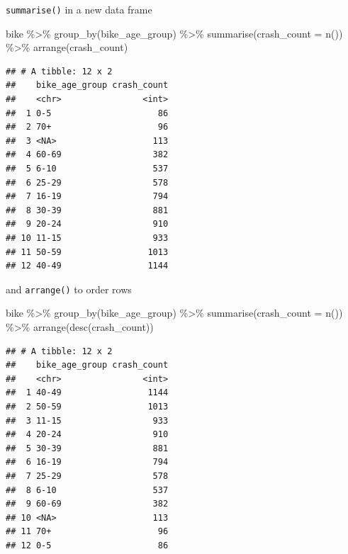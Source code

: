\documentclass[
  ignorenonframetext,
]{beamer}
\newenvironment{Shaded}{\begin{snugshade}}{\end{snugshade}}
\newcommand{\AttributeTok}[1]{\textcolor[rgb]{0.77,0.63,0.00}{#1}}
\newcommand{\FunctionTok}[1]{\textcolor[rgb]{0.00,0.00,0.00}{#1}}
\newcommand{\NormalTok}[1]{#1}
\newcommand{\SpecialCharTok}[1]{\textcolor[rgb]{0.00,0.00,0.00}{#1}}
\begin{document}
\begin{frame}[fragile]{\texttt{summarise()} in a new data frame}
\protect\hypertarget{summarise-in-a-new-data-frame}{}
\begin{Shaded}
\begin{Highlighting}[]
\NormalTok{bike }\SpecialCharTok{\%\textgreater{}\%}
  \FunctionTok{group\_by}\NormalTok{(bike\_age\_group) }\SpecialCharTok{\%\textgreater{}\%}
  \FunctionTok{summarise}\NormalTok{(}\AttributeTok{crash\_count =} \FunctionTok{n}\NormalTok{()) }\SpecialCharTok{\%\textgreater{}\%}
  \FunctionTok{arrange}\NormalTok{(crash\_count)}
\end{Highlighting}
\end{Shaded}

\begin{verbatim}
## # A tibble: 12 x 2
##    bike_age_group crash_count
##    <chr>                <int>
##  1 0-5                     86
##  2 70+                     96
##  3 <NA>                   113
##  4 60-69                  382
##  5 6-10                   537
##  6 25-29                  578
##  7 16-19                  794
##  8 30-39                  881
##  9 20-24                  910
## 10 11-15                  933
## 11 50-59                 1013
## 12 40-49                 1144
\end{verbatim}
\end{frame}

\begin{frame}[fragile]{and \texttt{arrange()} to order rows}
\protect\hypertarget{and-arrange-to-order-rows}{}
\begin{Shaded}
\begin{Highlighting}[]
\NormalTok{bike }\SpecialCharTok{\%\textgreater{}\%}
  \FunctionTok{group\_by}\NormalTok{(bike\_age\_group) }\SpecialCharTok{\%\textgreater{}\%}
  \FunctionTok{summarise}\NormalTok{(}\AttributeTok{crash\_count =} \FunctionTok{n}\NormalTok{()) }\SpecialCharTok{\%\textgreater{}\%}
  \FunctionTok{arrange}\NormalTok{(}\FunctionTok{desc}\NormalTok{(crash\_count))}
\end{Highlighting}
\end{Shaded}

\begin{verbatim}
## # A tibble: 12 x 2
##    bike_age_group crash_count
##    <chr>                <int>
##  1 40-49                 1144
##  2 50-59                 1013
##  3 11-15                  933
##  4 20-24                  910
##  5 30-39                  881
##  6 16-19                  794
##  7 25-29                  578
##  8 6-10                   537
##  9 60-69                  382
## 10 <NA>                   113
## 11 70+                     96
## 12 0-5                     86
\end{verbatim}
\end{frame}
\end{document}
